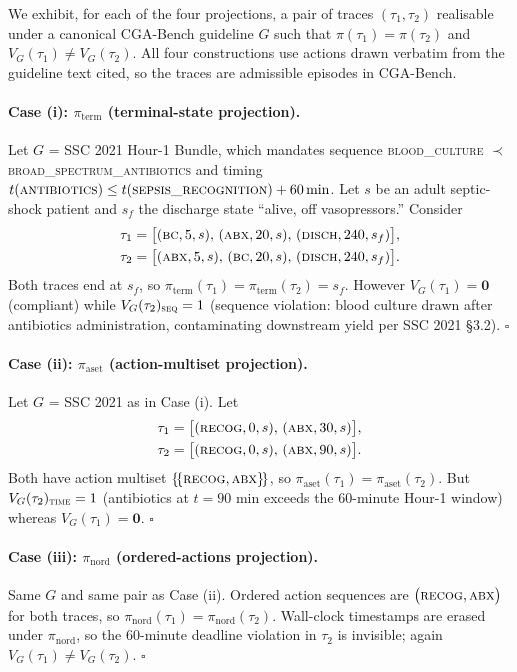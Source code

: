 We exhibit, for each of the four projections, a pair of traces
$(\tau_1,\tau_2)$ realisable under a canonical CGA-Bench guideline $G$
such that $\pi(\tau_1)=\pi(\tau_2)$ and $V_G(\tau_1)\neq V_G(\tau_2)$.
All four constructions use actions drawn verbatim from the guideline
text cited, so the traces are admissible episodes in CGA-Bench.

\paragraph{Case (i): $\pi_{\mathrm{term}}$ (terminal-state projection).}
Let $G$ = SSC 2021 Hour-1 Bundle, which mandates sequence
\textsc{blood\_culture} $\prec$ \textsc{broad\_spectrum\_antibiotics}
and timing $t(\textsc{antibiotics})\leq t(\textsc{sepsis\_recognition})+60\min$.
Let $s$ be an adult septic-shock patient and $s_f$ the discharge state
``alive, off vasopressors.'' Consider
\begin{align*}
\tau_1 &= \bigl[(\textsc{bc},5,s),\,(\textsc{abx},20,s),\,(\textsc{disch},240,s_f)\bigr], \\
\tau_2 &= \bigl[(\textsc{abx},5,s),\,(\textsc{bc},20,s),\,(\textsc{disch},240,s_f)\bigr].
\end{align*}
Both traces end at $s_f$, so $\pi_{\mathrm{term}}(\tau_1)=\pi_{\mathrm{term}}(\tau_2)=s_f$.
However $V_G(\tau_1)=\mathbf{0}$ (compliant) while
$V_G(\tau_2)_{\textsc{seq}}=1$ (sequence violation: blood culture drawn
after antibiotics administration, contaminating downstream yield per
SSC 2021 §3.2). \hfill $\square$

\paragraph{Case (ii): $\pi_{\mathrm{aset}}$ (action-multiset projection).}
Let $G$ = SSC 2021 as in Case (i). Let
\begin{align*}
\tau_1 &= \bigl[(\textsc{recog},0,s),\,(\textsc{abx},30,s)\bigr], \\
\tau_2 &= \bigl[(\textsc{recog},0,s),\,(\textsc{abx},90,s)\bigr].
\end{align*}
Both have action multiset $\{\!\{\textsc{recog},\textsc{abx}\}\!\}$,
so $\pi_{\mathrm{aset}}(\tau_1)=\pi_{\mathrm{aset}}(\tau_2)$. But
$V_G(\tau_2)_{\textsc{time}}=1$ (antibiotics at $t=90$ min exceeds the
60-minute Hour-1 window) whereas $V_G(\tau_1)=\mathbf{0}$. \hfill $\square$

\paragraph{Case (iii): $\pi_{\mathrm{nord}}$ (ordered-actions projection).}
Same $G$ and same pair as Case (ii). Ordered action sequences are
$\bigl(\textsc{recog},\textsc{abx}\bigr)$ for both traces, so
$\pi_{\mathrm{nord}}(\tau_1)=\pi_{\mathrm{nord}}(\tau_2)$. Wall-clock
timestamps are erased under $\pi_{\mathrm{nord}}$, so the 60-minute
deadline violation in $\tau_2$ is invisible; again
$V_G(\tau_1)\neq V_G(\tau_2)$. \hfill $\square$

